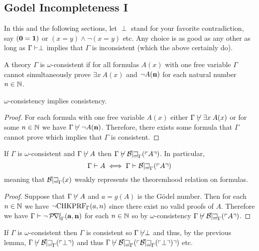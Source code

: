 \documentclass[12pt]{article}
\renewcommand{\eq}[1]{\exists{#1} \:}
\begin{document}
\subsection{Godel Incompleteness I}

In this and the following sections, let $\perp$ stand for your favorite contradiction, say $(\bf{0} = \bf{1})$ or $(x = y) \wedge \neg (x = y)$ etc. Any choice is as good as any other as long as $\Gamma \proves \perp$ implies that $\Gamma$ is inconsistent (which the above certainly do). 

\begin{definition} 
A theory $\Gamma$ is $\omega$-consistent if for all formulas $A(x)$ with one free variable $\Gamma$ cannot simultaneously prove $\eq{x} A(x)$ and $\neg A(\bf{n})$ for each natural number $n \in \N$.
\end{definition}

\begin{lemma}
$\omega$-consistency implies consistency.
\end{lemma}

\begin{proof}
For each formula with one free variable $A(x)$ either $\Gamma \not\proves \eq{x} A(x)$ or for some $n \in \N$ we have $\Gamma \not\proves \neg A(\bf{n})$. Therefore, there exists some formula that $\Gamma$ cannot prove which implies that $\Gamma$ is consistent. 
\end{proof}

\begin{lemma}
If $\Gamma$ is $\omega$-consistent and $\Gamma \not\proves A$ then $\Gamma \not\proves \Thm{A}$. In particular,
\[ \Gamma \proves A \iff \Gamma \proves \Thm{A} \] 
meaning that $\Bew_{\Gamma}(x)$ weakly represents the theoremhood relation on formulas.
\end{lemma}

\begin{proof}
Suppose that $\Gamma \not\proves A$ and $a = g(A)$ is the G\"{o}del number. Then for each $n \in \N$ we have $\neg \CHKPRF_{\Gamma}(a, n)$ since there exist no valid proofs of $A$. Therefore we have $\Gamma \proves \neg \Prf_{\Gamma}(\bf{a}, \bf{n})$ for each $n \in \N$ so by $\omega$-consistency $\Gamma \not\proves \Thm{A}$. 
\end{proof}

\begin{corollary}
If $\Gamma$ is $\omega$-consistent then $\Gamma$ is consistent so $\Gamma \not\proves \perp$ and thus, by the previous lemma, $\Gamma \not\proves \Thm{\perp}$ and thus $\Gamma \not\proves \Thm{\Thm{\perp}}$ etc. 
\end{corollary}
\end{document}

